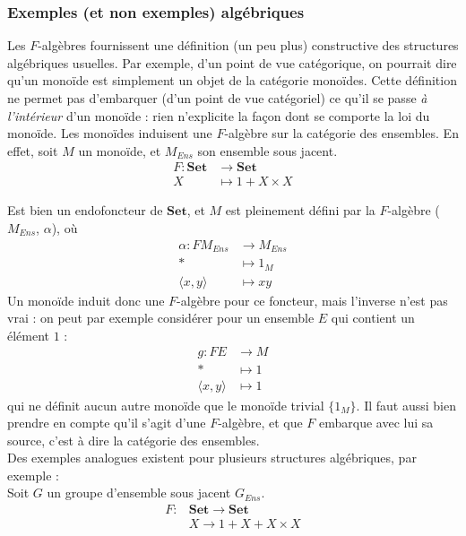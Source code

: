 \documentclass{article}
\begin{document}
\begin{center}
\end{center}

 
\subsubsection{Exemples (et non exemples) algébriques}
 
    Les $F$-algèbres fournissent une définition (un peu plus) constructive des structures algébriques usuelles. Par exemple, d'un point de vue catégorique, on pourrait dire qu'un monoïde est simplement un objet de la catégorie monoïdes. Cette définition ne permet pas d'embarquer (d'un point de vue catégoriel) ce qu'il se passe \textit{à l'intérieur} d'un monoïde : rien n'explicite la façon dont se comporte la loi du monoïde. Les monoïdes induisent une $F$-algèbre sur la catégorie des ensembles. En effet, soit $M$ un monoïde, et $ M_{Ens}$ son ensemble sous jacent.  
\begin{align*}
    F : \mathbf{Set} & \rightarrow \mathbf{Set} \\
    X & \mapsto 1 + X \times X
\end{align*}

Est bien un endofoncteur de $\mathbf{Set}$, et $M$ est pleinement défini par la $F$-algèbre ($M_{Ens}$, $\alpha$), où 
\begin{align*}
    \alpha : FM_{Ens} & \rightarrow M_{Ens} \\ 
                * & \mapsto 1_M \\ 
                \langle x, y \rangle & \mapsto xy
\end{align*}    
Un monoïde induit donc une $F$-algèbre pour ce foncteur, mais l'inverse n'est pas vrai : on peut par exemple considérer pour un ensemble $E$ qui contient un élément $1$ :
\begin{align*}
    g : F E & \rightarrow M \\
     * & \mapsto 1 \\ 
     \langle x,y \rangle & \mapsto 1 
\end{align*}
qui ne définit aucun autre monoïde que le monoïde trivial $\{ 1_M \} $. Il faut aussi bien prendre en compte qu'il s'agit d'une $F$-algèbre, et que $F$ embarque avec lui sa source, c'est à dire la catégorie des ensembles. 
\\ 
Des exemples analogues existent pour plusieurs structures algébriques, par exemple : 
\\
Soit $G$ un groupe d'ensemble sous jacent $G_{Ens}$.
\begin{align*}
    F :&  \mathbf{Set}  \rightarrow \mathbf{Set}\\
      & X  \rightarrow 1 + X + X \times X
\end{align*}
\end{document}
